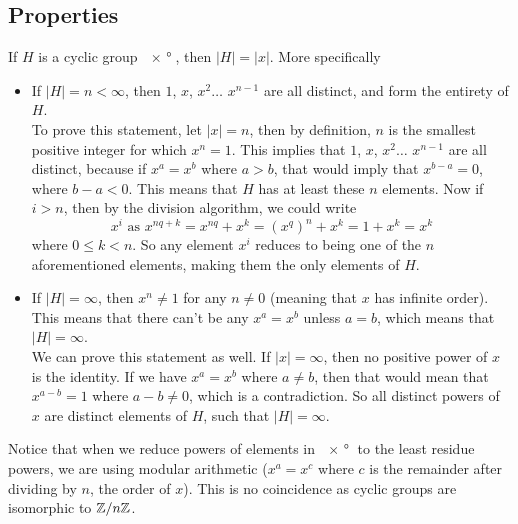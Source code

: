 \documentclass[12pt]{article}
\begin{document}
    \subsection*{Properties}

    If $H$ is a cyclic group $\ang{x}$,
    then $|H| = |x|$.
    More specifically
    \begin{itemize}[label=$\diamond$]
        \item 
            If $|H| = n < \infty$,
            then $1$, $x$, $x^2 \dots$ $x^{n-1}$ are all distinct,
            and form the entirety of $H$. \\
            To prove this statement,
            let $|x| = n$, then by definition,
            $n$ is the smallest positive integer for which $x^n = 1$.
            This implies that $1$, $x$, $x^2 \dots$ $x^{n-1}$
            are all distinct, because if $x^a = x^b$ where $a > b$,
            that would imply that $x^{b-a} = 0$,
            where $b-a < 0$. 
            This means that $H$ has at least these $n$ elements.
            Now if $i > n$, then by the division algorithm,
            we could write
            \[ x^i \text{ as } x^{nq + k} = x^{nq} + x^k = (x^q)^{n} + x^k 
            = 1 + x^k = x^k \]
            where $0 \leqslant k < n$.
            So any element $x^i$ reduces to being one of the $n$
            aforementioned elements, making them the only elements of $H$.
        \item 
            If $|H| = \infty$,
            then $x^n \neq 1$ for any $n \neq 0$
            (meaning that $x$ has infinite order).
            This means that there can't be any $x^a = x^b$
            unless $a = b$,
            which means that $|H| = \infty$. \\
            We can prove this statement as well.
            If $|x| = \infty$,
            then no positive power of $x$ is the identity.
            If we have $x^a = x^b$ where $a \neq b$,
            then that would mean that $x^{a-b} = 1$ where $a-b \neq 0$,
            which is a contradiction.
            So all distinct powers of $x$ are distinct elements of $H$,
            such that $|H| = \infty$.
    \end{itemize}
    
    Notice that when we reduce powers of elements in $\ang{x}$
    to the least residue powers, we are using modular arithmetic
    ($x^a = x^c$ where $c$ is the remainder after dividing by $n$,
    the order of $x$).
    This is no coincidence as
    cyclic groups are isomorphic to $\mathbb{Z}/n\mathbb{Z}$. \\
\end{document}
